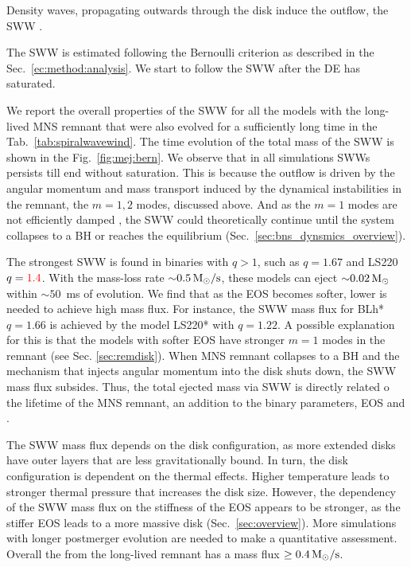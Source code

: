 Density waves, propagating outwards through the disk induce the outflow, the \ac{SWW} 
\citep{Nedora:2019jhl}.


The \ac{SWW} is estimated following the Bernoulli criterion as described in 
the Sec.~\ref{ec:method:analysis}. 
We start to follow the \ac{SWW} after the \ac{DE} has saturated. 

We report the overall properties of the \ac{SWW} for all the models with the 
long-lived \ac{MNS} remnant that were also evolved for a sufficiently long time 
in the Tab.~\ref{tab:spiralwavewind}. 
The time evolution of the total mass of the \ac{SWW} is shown in the Fig.~\ref{fig:mej:bern}.
We observe that in all simulations \acp{SWW} persists till end without saturation.
This is because the outflow is driven by the angular momentum and mass transport 
induced by the dynamical instabilities in the remnant, the $m=1,2$ modes, discussed 
above. And as the $m=1$ modes are not efficiently damped \citep{Paschalidis:2015mla,Radice:2016gym,Lehner:2016wjg,East:2016zvv},
the \ac{SWW} could theoretically continue until the system collapses to a \ac{BH} 
or reaches the equilibrium (Sec.~\ref{sec:bns_dynsmics_overview}).

The strongest \ac{SWW} is found in binaries with $q>1$, such as 
$q=1.67$ and LS220 $q=\textcolor{red}{1.4}$. 
With the mass-loss rate ${\sim}0.5\, {\text{M}_{\odot}}/{\text{s}}$, these models can eject 
${\sim}0.02\,{\text{M}_{\odot}}$ within ${\sim}50$~ms of \pmerg{} evolution.
We find that as the \ac{EOS} becomes softer, lower \mr{} is needed to achieve high 
mass flux. For instance, the \ac{SWW} mass flux for BLh* $q=1.66$ is achieved by the 
model LS220* with $q=1.22$. 
A possible explanation for this is that the models with softer \ac{EOS} have stronger 
$m=1$ modes in the remnant (see Sec. \ref{sec:remdisk}).
When \ac{MNS} remnant collapses to a \ac{BH} and the mechanism that injects angular 
momentum into the disk shuts down, the \ac{SWW} mass flux subsides. 
Thus, the total ejected mass via \ac{SWW} is directly related  o the lifetime of the 
\ac{MNS} remnant, an addition to the binary parameters, \ac{EOS} and \mr{}.

The \ac{SWW} mass flux depends on the disk configuration, as more extended disks 
have outer layers that are less gravitationally bound. In turn, the disk 
configuration is dependent on the thermal effects. Higher temperature leads to 
stronger thermal pressure that increases the disk size. 
However, the dependency of the \ac{SWW} mass flux on the stiffness of the \ac{EOS} 
appears to be stronger, as the stiffer \ac{EOS} leads to a more massive disk 
(Sec.~\ref{sec:overview}). More simulations with longer postmerger evolution are needed 
to make a quantitative assessment. 
Overall the \swind{} from the long-lived remnant has a mass flux $\geq 0.4\, {\text{M}_{\odot}}/{\text{s}}$.

